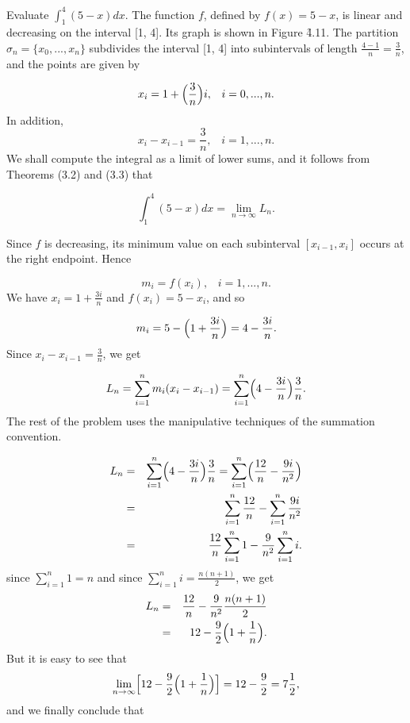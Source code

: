 \begin{example}
Evaluate $\int_{1}^{4} (5 - x) dx$. The function $f$, defined by $f(x) = 5 - x$, is linear and decreasing on the interval [1, 4]. Its graph is shown in Figure \f{4.11}. The partition $\sigma_{n} = \{ x_{0}, . . ., x_{n} \}$ subdivides the interval [1, 4] into subintervals of length $\frac{4 - 1}{n} = \frac{3}{n}$, and the points are given by  

$$
x_{i} = 1 + \Bigl(\frac{3}{n}\Bigr) i, \;\;\;  i = 0, . . . , n.
$$
\noindent In addition,
$$
x_{i} - x_{i-1} = \frac{3}{n}, \;\;\;  i = 1, ... , n.
$$
\noindent We shall compute the integral as a limit of lower sums, and it follows from Theorems (3.2) and (3.3) that

$$
\int_{1}^{4} (5 - x)dx = \lim_{n \rightarrow \infty} L_n.
$$

\noindent Since $f$ is decreasing, its minimum value on each subinterval $[x_{i-1}, x_i]$ occurs at the right endpoint. Hence

$$
m_i = f(x_i),           \;\;\;   i= 1,...,n.
$$
\noindent We have $x_i = 1 +\frac{3i}{n}$ and $f(x_i) = 5 - x_i$, and so 

$$
m_i= 5 - \Bigl( 1 + \frac{3i}{n} \Bigr)  = 4 - \frac{3i}{n}.
$$
\noindent Since $x_{i} - x_{i-1} = \frac{3}{n}$, we get 

$$
L_n = \sum_{i=1}^{n} m_{i}(x_{i} - x_{i-1}) = \sum_{i=1}^{n} \Bigl( 4 - \frac{3i}{n} \Bigr) \frac{3}{n}.
$$
\noindent The rest of the problem uses the manipulative techniques of the summation convention.

\begin{eqnarray*}
L_n &=& \sum_{i=1}^{n} \Bigl( 4 - \frac{3i}{n} \Bigr) \frac{3}{n} =  \sum_{i=1}^{n} \Bigl( \frac{12}{n} - \frac{9i}{n^2} \Bigr)\\
       &=& \sum_{i=1}^{n} \frac{12}{n} -  \sum_{i=1}^{n} \frac{9i}{n^2} \\
       &=& \frac{12}{n} \sum_{i=1}^{n} 1 - \frac{9}{n^2} \sum_{i=1}^{n} i.
\end{eqnarray*}
\noindent since $\sum_{i=1}^{n} 1 = n$ and since $\sum_{i=1}^{n}  i = \frac{n(n + 1)}{2}$, we get 
\begin{eqnarray*}
L_n &=& \frac{12}{n} - \frac{9}{n^2} \frac{ n(n+ 1)}{2} \\
       &=&12 - \frac{9}{2} \Bigl(1 + \frac{1}{n} \Bigr) .
\end{eqnarray*}
\noindent But it is easy to see that 
$$
\lim_{n \rightarrow \infty} \Bigl [12 - \frac{9}{2} \Bigl( 1 + \frac{1}{n} \Bigr) \Bigr] = 12 - \frac{9}{2} = 7
\frac{1}{2},
$$
\noindent and we finally conclude that


\end{example}
